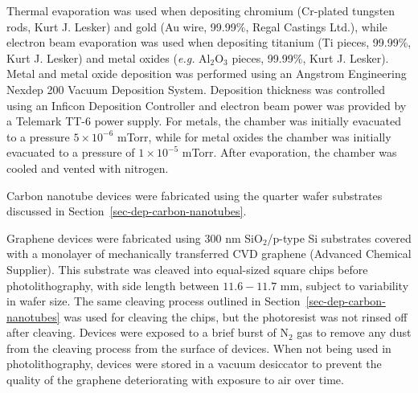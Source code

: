 \documentclass[
  letterpaper,
  DIV=11,
  numbers=noendperiod]{scrartcl}
\begin{document}
Thermal evaporation was used when depositing chromium (Cr-plated
tungsten rods, Kurt J. Lesker) and gold (Au wire, 99.99\%, Regal
Castings Ltd.), while electron beam evaporation was used when depositing
titanium (Ti pieces, 99.99\%, Kurt J. Lesker) and metal oxides
(\emph{e.g.} Al\(_2\)O\(_3\) pieces, 99.99\%, Kurt J. Lesker). Metal and
metal oxide deposition was performed using an Angstrom Engineering
Nexdep 200 Vacuum Deposition System. Deposition thickness was controlled
using an Inficon Deposition Controller and electron beam power was
provided by a Telemark TT-6 power supply. For metals, the chamber was
initially evacuated to a pressure \(5 \times 10^{-6}\) mTorr, while for
metal oxides the chamber was initially evacuated to a pressure of
\(1 \times 10^{-5}\) mTorr. After evaporation, the chamber was cooled
and vented with nitrogen.

Carbon nanotube devices were fabricated using the quarter wafer
substrates discussed in Section~\ref{sec-dep-carbon-nanotubes}.

Graphene devices were fabricated using 300 nm SiO\(_2\)/p-type Si
substrates covered with a monolayer of mechanically transferred CVD
graphene (Advanced Chemical Supplier). This substrate was cleaved into
equal-sized square chips before photolithography, with side length
between \(11.6-11.7\) mm, subject to variability in wafer size. The same
cleaving process outlined in Section~\ref{sec-dep-carbon-nanotubes} was
used for cleaving the chips, but the photoresist was not rinsed off
after cleaving. Devices were exposed to a brief burst of N\(_2\) gas to
remove any dust from the cleaving process from the surface of devices.
When not being used in photolithography, devices were stored in a vacuum
desiccator to prevent the quality of the graphene deteriorating with
exposure to air over time.
\end{document}
